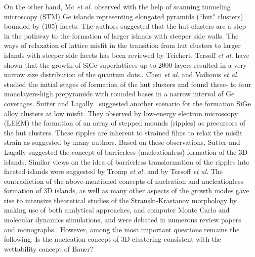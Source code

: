 \documentclass[aps,prl,showpacs,twocolumn,byrevtex,floatfix]{revtex4-1}
\begin{document}
On the other hand, Mo {\it et al.}\cite{Mo90} observed with the help of
scanning tunneling microscopy (STM) Ge islands representing elongated 
pyramids (``hut"
clusters) bounded by (105) facets. The authors suggested that the hut clusters
are a step in the pathway to the formation of larger islands with steeper side
walls.\cite{Sutter04,Lutz94,Brehm11} The ways of relaxation of lattice misfit
in the transition from hut clusters to larger islands with steeper side
facets has been reviewed by Teichert.\cite{Teichert02} Tersoff {\it et al.}
have shown that the growth of SiGe superlattices up to 2000 layers resulted in a
very narrow size distribution of the quantum dots.\cite{Tersoff96}. Chen {\it et
al.}\cite{Chen97} and Vailionis {\it et al.}
\cite{Vailionis00} studied the initial stages of formation of the hut clusters
and found three- to four monolayers-high prepyramids with rounded bases in a
narrow interval of Ge coverages. Sutter and Lagally~\cite{Sutter00} suggested
another scenario for the formation SiGe alloy clusters at low misfit. They
observed by low-energy electron microscopy (LEEM) the formation of an array
of stepped mounds (ripples) as precursors of the hut clusters. These ripples
are inherent to strained films to relax the misfit strain as suggested by many
authors.\cite{Asaro72,Grinfeld86,Srolovitz89,Pimpinelli98} Based on these
observations, Sutter and Lagally suggested the concept of barrierless
(nucleationless) formation of the 3D islands.\cite{Sutter00} Similar views on
the idea of barrierless transformation of the ripples into faceted islands were
suggested by Tromp {\it et al.}\cite{Tromp00} and by Tersoff {\it et
al.}\cite{Tersoff02} The contradiction of the above-mentioned concepts of
nucleation and nucleationless formation of 3D islands, as well as many other
aspects of the growth modes gave rise to intensive theoretical studies of the
Stranski-Krastanov morphology by making use of both analytical
approaches\cite{Ratsch93,Merwe00,Kukushkin02}, and computer Monte
Carlo\cite{Petrov12,Biehl03,Khor00,Avery97} and molecular
dynamics\cite{Ashu91,Roland93,Joyce97,Xu04} simulations, and were debated in
numerous review papers and
monographs.\cite{Dubrovskii14,Shchukin99,Shchukin03,Bhatta15}. However, among
the most important questions remains the following: Is the nucleation concept of
3D clustering consistent with the wettability concept of Bauer?
\end{document}
